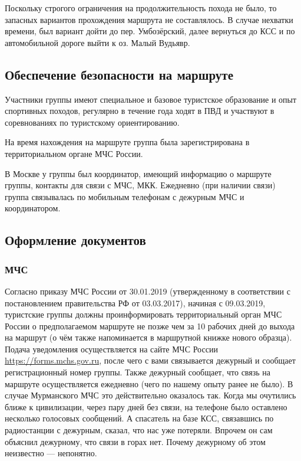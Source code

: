 Поскольку строгого ограничения на продолжительность похода не было, то запасных вариантов прохождения маршрута не
составлялось. В случае нехватки времени, был вариант дойти до пер. Умбозёрский, далее вернуться до КСС
и по автомобильной дороге выйти к оз. Малый Вудьявр.

\subsection{Обеспечение безопасности на маршруте}
Участники группы имеют специальное и базовое туристское образование и опыт спортивных походов, регулярно в течение года ходят в ПВД и участвуют в соревнованиях по туристскому ориентированию.

На время нахождения на маршруте группа была зарегистрирована в территориальном органе МЧС России.

В Москве у группы был координатор, имеющий информацию о маршруте группы, контакты для связи с МЧС, МКК.
Ежедневно (при наличии связи) группа связывалась по мобильным телефонам с дежурным МЧС и координатором.

\subsection{Оформление документов}
\subsubsection{МЧС}
Согласно приказу МЧС России  от 30.01.2019 (утвержденному в соответствии с
постановлением правительства РФ  от 03.03.2017), начиная с 09.03.2019, туристские группы должны
проинформировать территориальный орган МЧС России о предполагаемом маршруте не позже чем за 10 рабочих дней
до выхода на маршрут (о чём также напоминается в маршрутной книжке нового образца).
Подача уведомления осуществляется на сайте МЧС России \url{https://forms.mchs.gov.ru},
после чего с вами связывается дежурный и сообщает регистрационный номер группы.
Также дежурный сообщает, что связь на маршруте осуществляется ежедневно (чего по нашему опыту ранее не было).
В случае Мурманского МЧС это действительно оказалось так. Когда мы очутились ближе к цивилизации,
через пару дней без связи, на телефоне было оставлено несколько голосовых сообщений.
А спасатель на базе КСС, связавшись по радиостанции с дежурным, сказал, что нас уже потеряли.
Впрочем он сам объяснил дежурному, что связи в горах нет. Почему дежурному об этом неизвестно --- непонятно.

